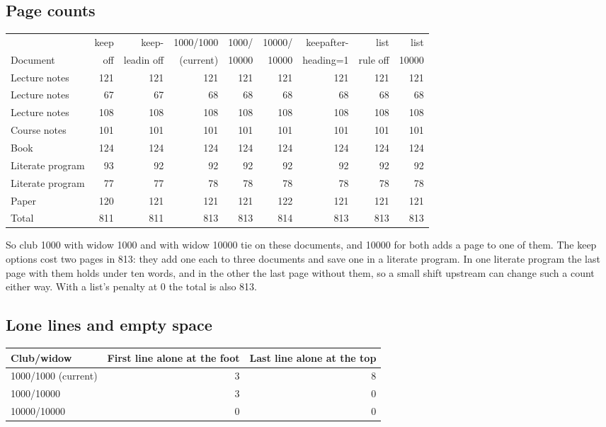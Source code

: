 \subsection{Page counts}

\begin{center}\small
\begin{tabular}{@{}lrrrrrrrr@{}}
\toprule
& keep & keep- & 1000/1000 & 1000/ & 10000/ & keepafter- & list & list \\
Document & off & leadin off & (current) & 10000 & 10000 & heading=1 & rule off & 10000 \\
\midrule
Lecture notes & 121 & 121 & 121 & 121 & 121 & 121 & 121 & 121 \\
Lecture notes & 67 & 67 & 68 & 68 & 68 & 68 & 68 & 68 \\
Lecture notes & 108 & 108 & 108 & 108 & 108 & 108 & 108 & 108 \\
Course notes & 101 & 101 & 101 & 101 & 101 & 101 & 101 & 101 \\
Book & 124 & 124 & 124 & 124 & 124 & 124 & 124 & 124 \\
Literate program & 93 & 92 & 92 & 92 & 92 & 92 & 92 & 92 \\
Literate program & 77 & 77 & 78 & 78 & 78 & 78 & 78 & 78 \\
Paper & 120 & 121 & 121 & 121 & 122 & 121 & 121 & 121 \\
\midrule
Total & 811 & 811 & 813 & 813 & 814 & 813 & 813 & 813 \\
\bottomrule
\end{tabular}
\end{center}

So club 1000 with widow 1000 and with widow 10000 tie on these documents, and 10000 for both adds
a page to one of them.
The keep options cost two pages in 813: they add one each to three documents and save one in a
literate program.
In one literate program the last page with them holds under ten words, and in the other the last
page without them, so a small shift upstream can change such a count either way.
With a list's penalty at 0 the total is also 813.

\subsection{Lone lines and empty space}

\begin{center}\small
\begin{tabular}{@{}lrr@{}}
\toprule
Club/widow & First line alone at the foot & Last line alone at the top \\
\midrule
1000/1000 (current) & 3 & 8 \\
1000/10000 & 3 & 0 \\
10000/10000 & 0 & 0 \\
\bottomrule
\end{tabular}
\end{center}

